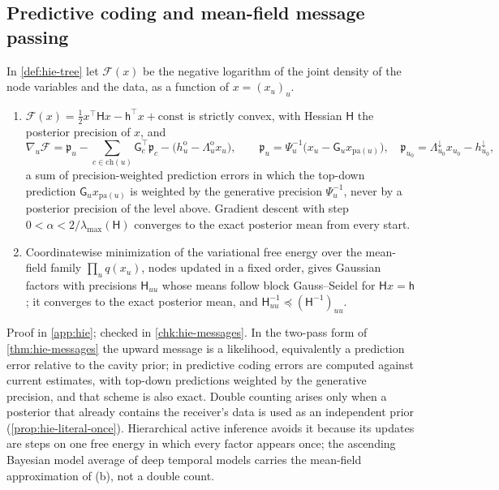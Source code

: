 \subsection{Predictive coding and mean-field message passing}\label{sup:hie-predictive-coding-and-mean-field-message}

\begin{proposition}\label{prop:hie-predictive-coding}
In \cref{def:hie-tree} let $\mathcal F(x)$ be the negative logarithm of the joint density of the node variables and the data, as a function of $x=(x_u)_u$.
\begin{enumerate}
\item[(a)] $\mathcal F(x)=\frac12x^\top\mathsf Hx-\mathsf h^\top x+\text{const}$ is strictly convex, with Hessian $\mathsf H$ the posterior precision of $x$, and
\begin{equation}\label{eq:hie-pc}
\nabla_u\mathcal F=\mathfrak p_u-\sum_{c\in\mathrm{ch}(u)}\mathsf G_c^\top\mathfrak p_c-\bigl(h^{\mathrm o}_u-\Lambda^{\mathrm o}_ux_u\bigr),\qquad\mathfrak p_u=\Psi_u^{-1}\bigl(x_u-\mathsf G_ux_{\mathrm{pa}(u)}\bigr),\quad\mathfrak p_{u_0}=\Lambda^\downarrow_{u_0}x_{u_0}-h^\downarrow_{u_0},
\end{equation}
a sum of precision-weighted prediction errors in which the top-down prediction $\mathsf G_ux_{\mathrm{pa}(u)}$ is weighted by the generative precision $\Psi_u^{-1}$, never by a posterior precision of the level above. Gradient descent with step $0<\alpha<2/\lambda_{\max}(\mathsf H)$ converges to the exact posterior mean from every start.
\item[(b)] Coordinatewise minimization of the variational free energy over the mean-field family $\prod_uq(x_u)$, nodes updated in a fixed order, gives Gaussian factors with precisions $\mathsf H_{uu}$ whose means follow block Gauss--Seidel for $\mathsf Hx=\mathsf h$; it converges to the exact posterior mean, and $\mathsf H_{uu}^{-1}\preceq(\mathsf H^{-1})_{uu}$.
\end{enumerate}
\end{proposition}

Proof in \cref{app:hie}; checked in \cref{chk:hie-messages}. In the two-pass form of \cref{thm:hie-messages} the upward message is a likelihood, equivalently a prediction error relative to the cavity prior; in predictive coding errors are computed against current estimates, with top-down predictions weighted by the generative precision, and that scheme is also exact. Double counting arises only when a posterior that already contains the receiver's data is used as an independent prior (\cref{prop:hie-literal-once}). Hierarchical active inference avoids it because its updates are steps on one free energy in which every factor appears once; the ascending Bayesian model average of deep temporal models \citep{friston2017graphical} carries the mean-field approximation of (b), not a double count.

